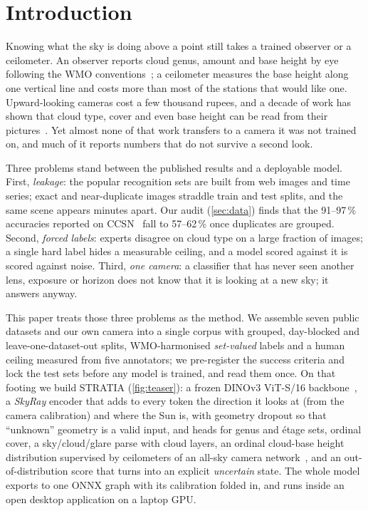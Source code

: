 \section{Introduction}
\label{sec:intro}

Knowing what the sky is doing above a point still takes a trained observer or a ceilometer. An observer reports
cloud genus, amount and base height by eye following the WMO conventions~\cite{wmo2017atlas}; a ceilometer
measures the base height along one vertical line and costs more than most of the stations that would like one.
Upward-looking cameras cost a few thousand rupees, and a decade of work has shown that cloud type, cover and even
base height can be read from their pictures~\cite{zhang2018cloudnet,dev2017colorbased,liu2020mgcd}. Yet almost
none of that work transfers to a camera it was not trained on, and much of it reports numbers that do not survive
a second look.

Three problems stand between the published results and a deployable model. First, \emph{leakage}: the popular
recognition sets are built from web images and time series; exact and near-duplicate images straddle train and
test splits, and the same scene appears minutes apart. Our audit (\cref{sec:data}) finds that the 91--97\,\%
accuracies reported on CCSN~\cite{zhang2018cloudnet} fall to 57--62\,\% once duplicates are grouped. Second,
\emph{forced labels}: experts disagree on cloud type on a large fraction of images; a single hard label hides a
measurable ceiling, and a model scored against it is scored against noise. Third, \emph{one camera}: a classifier
that has never seen another lens, exposure or horizon does not know that it is looking at a new sky; it answers
anyway.

This paper treats those three problems as the method. We assemble seven public datasets and our own camera into a
single corpus with grouped, day-blocked and leave-one-dataset-out splits, WMO-harmonised \emph{set-valued} labels
and a human ceiling measured from five annotators; we pre-register the success criteria and lock the test sets
before any model is trained, and read them once. On that footing we build STRATIA (\cref{fig:teaser}): a frozen
DINOv3 ViT-S/16 backbone~\cite{simeoni2025dinov3}, a \emph{SkyRay} encoder that adds to every token the direction it
looks at (from the camera calibration) and where the Sun is, with geometry dropout so that ``unknown'' geometry is a
valid input, and heads for genus and \'etage sets, ordinal cover, a sky/cloud/glare parse with cloud layers, an
ordinal cloud-base height distribution supervised by ceilometers of an all-sky camera network~\cite{eye2sky}, and
an out-of-distribution score that turns into an explicit \emph{uncertain} state. The whole model exports to one ONNX
graph with its calibration folded in, and runs inside an open desktop application on a laptop GPU.

